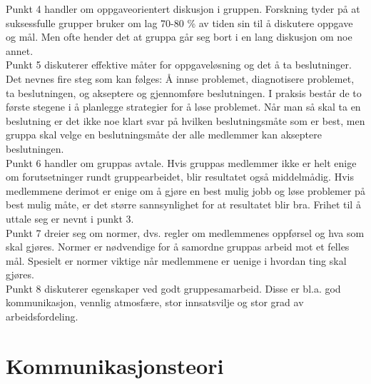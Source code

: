 
Punkt 4 handler om oppgaveorientert diskusjon i gruppen. Forskning tyder på at suksessfulle grupper bruker om lag 70-80 \% av tiden sin til å diskutere oppgave og mål. Men ofte hender det at gruppa går seg bort i en lang diskusjon om noe annet. \\

Punkt 5 diskuterer effektive måter for oppgaveløsning og det å ta beslutninger. Det nevnes fire steg som kan følges: Å innse problemet, diagnotisere problemet, ta beslutningen, og akseptere og gjennomføre beslutningen. I praksis består de to første stegene i å planlegge strategier for å løse problemet. Når man så skal ta en beslutning er det ikke noe klart svar på hvilken beslutningsmåte som er best, men gruppa skal velge en beslutningsmåte der alle medlemmer kan akseptere beslutningen.  \\

Punkt 6 handler om gruppas avtale. Hvis gruppas medlemmer ikke er helt enige om forutsetninger rundt gruppearbeidet, blir resultatet også middelmådig. Hvis medlemmene derimot er enige om å gjøre en best mulig jobb og løse problemer på best mulig måte, er det større sannsynlighet for at resultatet blir bra. Frihet til å uttale seg er nevnt i punkt 3. \\

Punkt 7 dreier seg om normer, dvs. regler om medlemmenes oppførsel og hva som skal gjøres. Normer er nødvendige for å samordne gruppas arbeid mot et felles mål. Spesielt er normer viktige når medlemmene er uenige i hvordan ting skal gjøres. \\

Punkt 8 diskuterer egenskaper ved godt gruppesamarbeid. Disse er bl.a. god kommunikasjon, vennlig atmosfære, stor innsatsvilje og stor grad av arbeidsfordeling.\\

\section{Kommunikasjonsteori}
\label{sec:kommunikasjonsteori}

